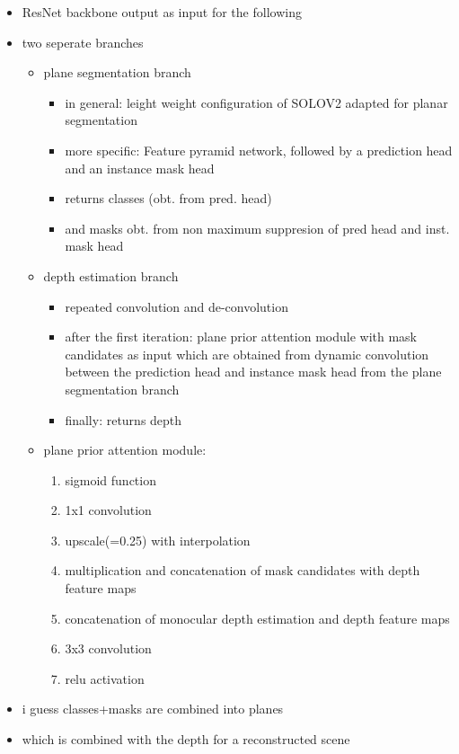\documentclass[main.tex]{subfiles}
\begin{document}
\begin{itemize}
    \item ResNet backbone output as input for the following
    \item two seperate branches
          \begin{itemize}
              \item plane segmentation branch
                    \begin{itemize}
                        \item in general: leight weight configuration of SOLOV2 \cite{wang2020solov2} adapted for planar segmentation
                        \item more specific: Feature pyramid network, followed by a prediction head and an instance mask head
                        \item returns classes (obt. from pred. head)
                        \item and masks obt. from non maximum suppresion of pred head and inst. mask head
                    \end{itemize}
              \item depth estimation branch
                    \begin{itemize}
                        \item repeated convolution and de-convolution
                        \item after the first iteration: plane prior attention module with mask candidates as input which are obtained
                              from dynamic convolution between the prediction head and instance mask head from the plane segmentation branch
                        \item finally: returns depth
                    \end{itemize}
              \item plane prior attention module:
                    \begin{enumerate}
                        \item sigmoid function
                        \item 1x1 convolution
                        \item upscale(=0.25) with interpolation
                        \item multiplication and concatenation of mask candidates with depth feature maps
                        \item concatenation of monocular depth estimation and depth feature maps
                        \item 3x3 convolution
                        \item relu activation
                    \end{enumerate}
          \end{itemize}
    \item i guess classes+masks are combined into planes
    \item which is combined with the depth for a reconstructed scene
\end{itemize}
\end{document}
